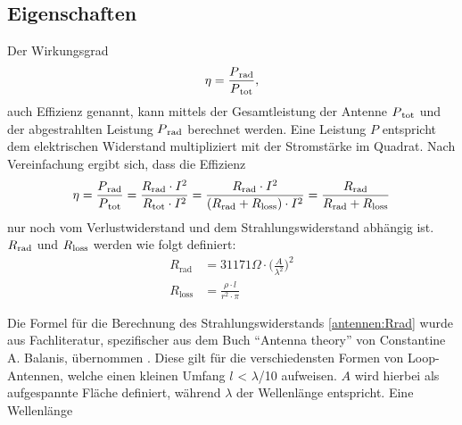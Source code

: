 \subsection{Eigenschaften\label{antennen:antennenEigenschaften}}
Der Wirkungsgrad
\begin{equation}
	\eta=\frac{P\textsubscript{rad}}{P\textsubscript{tot}},
	\label{antennen:Wirkungsgrad}
\end{equation}
auch Effizienz genannt, kann mittels der Gesamtleistung der Antenne $P\textsubscript{tot}$ und der abgestrahlten Leistung $P\textsubscript{rad}$ berechnet werden. Eine Leistung $P$ entspricht dem elektrischen Widerstand multipliziert mit der Stromstärke im Quadrat. Nach Vereinfachung ergibt sich, dass die Effizienz
\begin{equation}
	\eta=\frac{P\textsubscript{rad}}{P\textsubscript{tot}}=\frac{R\textsubscript{rad}\cdot{I^2}}{R\textsubscript{tot}\cdot{I^2}}=\frac{R\textsubscript{rad}\cdot{I^2}}{(R\textsubscript{rad}+R\textsubscript{loss})\cdot{I^2}}=\frac{R\textsubscript{rad}}{R\textsubscript{rad}+R\textsubscript{loss}}
	\label{antennen:Wirkungsgradkomplett}
\end{equation}
nur noch vom Verlustwiderstand und dem Strahlungswiderstand abhängig ist. $R\textsubscript{rad}$ und $R\textsubscript{loss}$ werden wie folgt definiert:
\begin{align}
	R_{\text{rad}} &= 31171 \Omega \cdot \bigg( \frac{A}{\lambda^2} \bigg)^2 \tag{20.3} \label{antennen:Rrad} \\
	R_{\text{loss}} &= \frac{\rho \cdot l}{r^2 \cdot \pi} \tag{20.4} \label{antennen:Rloss}
\end{align}

Die Formel für die Berechnung des Strahlungswiderstands \eqref{antennen:Rrad} wurde aus Fachliteratur, spezifischer aus dem Buch ``Antenna theory'' von Constantine A. Balanis, übernommen \cite{antennen:antennaTheory}. Diese gilt für die verschiedensten Formen von Loop-Antennen, welche einen kleinen Umfang  $l$ < $\lambda$/10 aufweisen. $A$ wird hierbei als aufgespannte Fläche definiert, während $\lambda$ der Wellenlänge entspricht. Eine Wellenlänge 
\setcounter{equation}{4}

